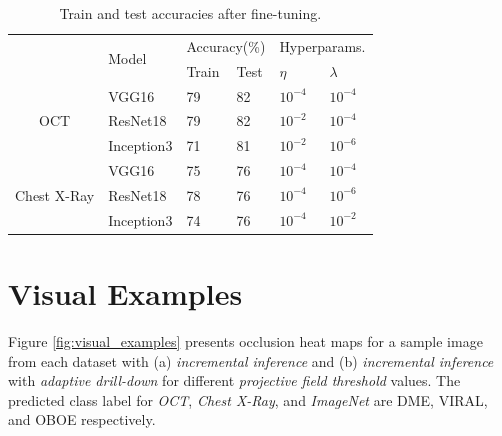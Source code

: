 \begin{table}[ht]
\begin{tabular}{|c|l|l|l|l|l|l|}
\hline
\multicolumn{1}{|l|}{\multirow{3}{*}{}} & \multirow{3}{*}{Model} & \multicolumn{2}{l|}{\multirow{2}{*}{Accuracy(\%)}} & \multicolumn{3}{l|}{\multirow{2}{*}{Hyperparams.}} \\
\multicolumn{1}{|l|}{} &  & \multicolumn{2}{l|}{} & \multicolumn{3}{l|}{} \\ \cline{3-7} 
\multicolumn{1}{|l|}{} &  & Train & Test & \multicolumn{2}{l|}{$\eta$} & $\lambda$ \\ \hline
\multirow{3}{*}{OCT} & VGG16 & 79 & 82 & \multicolumn{2}{l|}{$10^{-4}$} & $10^{-4}$ \\ \cline{2-7} 
 & ResNet18 & 79 & 82 & \multicolumn{2}{l|}{$10^{-2}$} & $10^{-4}$ \\ \cline{2-7} 
 & Inception3 & 71 & 81 & \multicolumn{2}{l|}{$10^{-2}$} & $10^{-6}$ \\ \hline
\multirow{3}{*}{Chest X-Ray} & VGG16 & 75 & 76 & \multicolumn{2}{l|}{$10^{-4}$} & $10^{-4}$ \\ \cline{2-7} 
 & ResNet18 & 78 & 76 & \multicolumn{2}{l|}{$10^{-4}$} & $10^{-6}$ \\ \cline{2-7} 
 & Inception3 & 74 & 76 & \multicolumn{2}{l|}{$10^{-4}$} & $10^{-2}$ \\ \hline
\end{tabular}
\caption{Train and test accuracies after fine-tuning.}
\label{tbl:finetune_accuracies}
\end{table}

\section{Visual Examples}

Figure \ref{fig:visual_examples} presents occlusion heat maps for a sample image from each dataset with (a) \textit{incremental inference} and (b) \textit{incremental inference} with \textit{adaptive drill-down} for different \textit{projective field threshold} values. The predicted class label for \textit{OCT}, \textit{Chest X-Ray}, and \textit{ImageNet} are DME, VIRAL, and OBOE respectively.

